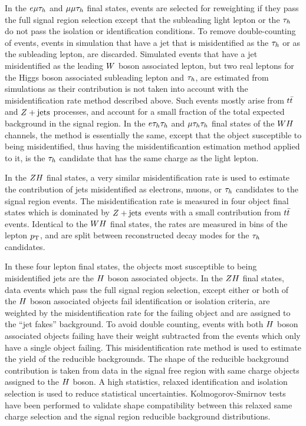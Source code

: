 In the $e\mu\tau_{h}$ and $\mu\mu\tau_{h}$ final states, 
events are selected for reweighting if they pass the full signal region 
selection except that the subleading light lepton or the $\tau_{h}$ do not 
pass the isolation or identification conditions.
To remove double-counting of events, events in simulation that have a jet that is 
misidentified as the $\tau_{h}$ or as the subleading lepton, are discarded. Simulated 
events that have a jet misidentified as the leading $W$ boson associated lepton, but two real leptons 
for the Higgs boson associated subleading lepton and $\tau_{h}$, are estimated from simulations as their 
contribution is not taken into account with the misidentification rate method 
described above. Such events mostly arise from $t\bar{t}$ and $Z+\textrm{jets}$ processes, 
and account for a small fraction of the total expected background in the signal region. 
In the $e\tau_{h}\tau_{h}$ and $\mu\tau_{h}\tau_{h}$ final states of the $WH$ channels, 
the method is essentially the same, except that the object susceptible to being misidentified,
thus having the misidentificantion estimation method applied to it, 
is the $\tau_{h}$ candidate that has the same charge as the light lepton.  

In the $ZH$ final states, a very similar misidentification rate is used
to estimate the contribution of jets misidentified as electrons, muons, or $\tau_{h}$
candidates to the signal region events. The misidentification rate is measured in four object final states which
is dominated by $Z+\textrm{jets}$ events with a small contribution from 
$t\bar{t}$ events. Identical to the $WH$ final states, the rates are measured 
in bins of the lepton $p_\mathrm{T}$, and are split between reconstructed decay modes for 
the $\tau_{h}$ candidates. 

In these four lepton final states, the objects most susceptible 
to being misidentified jets are the $H$ boson associated objects.
In the $ZH$ final states, data events which pass the full
signal region selection, except either or both of the $H$ boson associated objects
fail identification or isolation criteria, are weighted by the misidentification
rate for the failing object and are assigned to the ``jet fakes'' background.
To avoid double counting, events with both $H$ boson associated objects failing have their weight
subtracted from the events which only have a single object failing. 
This misidentification rate method is used to estimate the yield of the reducible
backgrounds. The shape of the reducible background contribution is taken from
data in the signal free region with same charge objects assigned to the $H$ boson.
A high statistics, relaxed identification and isolation selection is used to reduce
statistical uncertainties. Kolmogorov-Smirnov tests have been performed to validate
shape compatibility between this relaxed same charge selection and the signal region
reducible background distributions.



